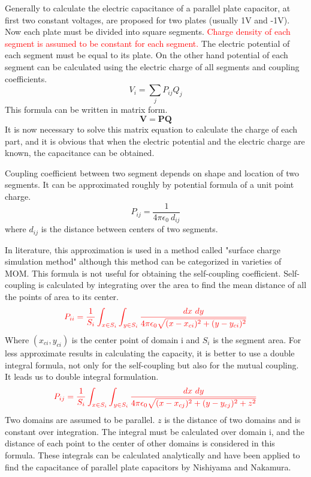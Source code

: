 \documentclass[final,5p,times,twocolumn]{elsarticle}
\begin{document}
Generally to calculate the electric capacitance of a parallel plate capacitor, at first two constant voltages, are proposed for two plates (usually 1V and -1V). Now each plate must be divided into square segments. \textcolor{red}{
 Charge density of each segment is assumed to be constant for each segment.} The electric potential of each segment must be equal to its plate. On the other hand potential of each segment can be calculated using the electric charge of all segments and coupling coefficients.
\begin{equation}
\label{eq1}
V_i = \sum_j P_{ij} Q_j
\end{equation}
This formula can be written in matrix form.
\begin{equation}
\label{eq2}
\mathbf V = \mathbf P \mathbf Q
\end{equation}
It is now necessary to solve this matrix equation to calculate the charge of each part, and it is obvious that when the electric potential and the electric charge are known, the capacitance can be obtained.
 
Coupling coefficient between two segment depends on shape and location of two segments. It can be approximated roughly by potential formula of a unit point charge. 
\begin{equation}
\label{eq3}
P_{ij} = \frac{1}{4 \pi \epsilon_0\  d_{ij}}
\end{equation}
where $d_{ij}$ is the distance between centers of two segments.


In literature, this approximation is used in a method called "surface charge simulation method"\cite {Zhou1993} although this method can be categorized in varieties of MOM. This formula is not useful for obtaining the self-coupling coefficient. Self-coupling is calculated by integrating over the area to find the mean distance of all the points of area to its center.
\begin{equation}
\label{eq4}
\textcolor{red}{
P_{ii} = \frac 1 {S_i} \int_{x \in S_i} \int_{y \in S_i} \frac {dx\  dy}{4 \pi \epsilon_0 \sqrt{(x-x_{ci})^2 + (y-y_{ci})^2}}
}
\end{equation}
Where $(x_{ci}, y_{ci})$ is the center point of domain i and $S_i $ is the segment area.
For less approximate results in calculating the capacity, it is better to use a double integral formula, not only for the self-coupling but also for the mutual coupling. It leads us to double integral formulation.
\begin{equation}
\label{eq5}
\textcolor{red}{
P_{ij} = \frac 1 {S_i}\int_{x \in S_i} \int_{y \in S_i} \frac {dx\  dy}{4 \pi \epsilon_0 \sqrt{(x-x_{cj})^2 + (y-y_{cj})^2+ z^2}}
}
\end{equation}
Two domains are assumed to be parallel. $z$ is the distance of two domains and is constant over integration. The integral must be calculated over domain i, and the distance of each point to the center of other domains is considered in this formula. These integrals can be calculated analytically and have been applied to find the capacitance of parallel plate capacitors by Nishiyama and Nakamura\cite {Nishiyama1994}.
\end{document}
